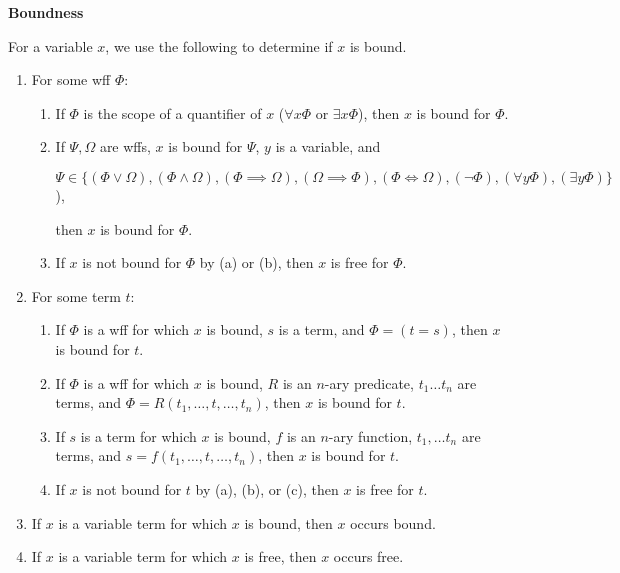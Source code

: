 \documentclass[11pt]{article}
\begin{document}
\begin{framed}
    \large
    \textbf{Boundness}
    \normalsize
    
    For a variable $x$, we use the following to determine if $x$ is bound.
    \begin{enumerate}
        \item For some wff $\Phi$:
        \begin{enumerate}
            \item If $\Phi$ is the scope of a quantifier of $x$ ($\forall x\Phi$ or $\exists x\Phi$), then $x$ is bound for $\Phi$.
            \item If $\Psi, \Omega$ are wffs, $x$ is bound for $\Psi$, $y$ is a variable, and 
            
                    $\Psi \in \{(\Phi \lor \Omega), (\Phi \land \Omega), (\Phi \implies \Omega), (\Omega \implies \Phi), (\Phi \iff \Omega), (\lnot\Phi), (\forall y\Phi), (\exists y\Phi)\}$), 
                    
                    then $x$ is bound for $\Phi$.
            \item If $x$ is not bound for $\Phi$ by (a) or (b), then $x$ is free for $\Phi$.
        \end{enumerate}
        \item For some term $t$:
        \begin{enumerate}
            \item If $\Phi$ is a wff for which $x$ is bound, $s$ is a term, and $\Phi = (t=s)$, then $x$ is bound for $t$.
            \item If $\Phi$ is a wff for which $x$ is bound, $R$ is an $n$-ary predicate, $t_1 \dots t_n$ are terms, and $\Phi = R(t_1, \dots, t, \dots, t_n)$, then $x$ is bound for $t$.
            \item If $s$ is a term for which $x$ is bound, $f$ is an $n$-ary function, $t_1,\dots t_n$ are terms, and $s = f(t_1, \dots, t, \dots, t_n)$, then $x$ is bound for $t$.
            \item If $x$ is not bound for $t$ by (a), (b), or (c), then $x$ is free for $t$.
        \end{enumerate}
        \item If $x$ is a variable term for which $x$ is bound, then $x$ occurs bound.
        \item If $x$ is a variable term for which $x$ is free, then $x$ occurs free.
        
    \end{enumerate}
\end{framed}
\end{document}
